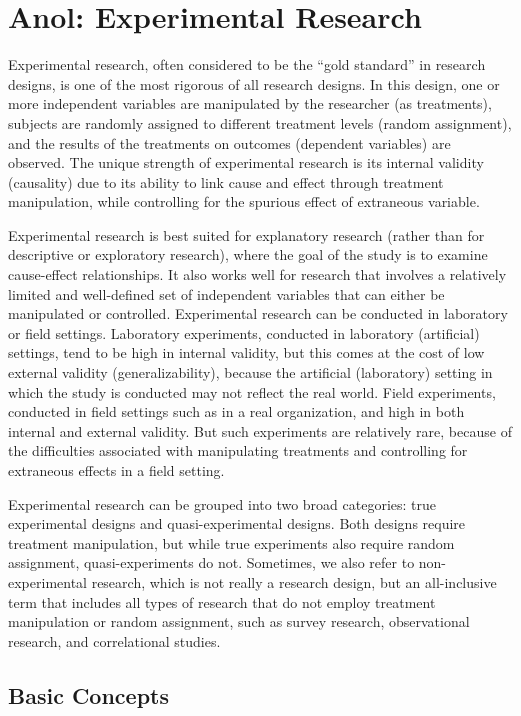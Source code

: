 \section{Anol: Experimental Research}

Experimental research, often considered to be the “gold standard” in research designs, is one of the most rigorous of all research designs. In this design, one or more independent variables are manipulated by the researcher (as treatments), subjects are randomly assigned to different treatment levels (random assignment), and the results of the treatments on outcomes (dependent variables) are observed. The unique strength of experimental research is its internal validity (causality) due to its ability to link cause and effect through treatment manipulation, while controlling for the spurious effect of extraneous variable.

Experimental research is best suited for explanatory research (rather than for descriptive or exploratory research), where the goal of the study is to examine cause-effect relationships. It also works well for research that involves a relatively limited and well-defined set of independent variables that can either be manipulated or controlled. Experimental research can be conducted in laboratory or field settings. Laboratory experiments, conducted in laboratory (artificial) settings, tend to be high in internal validity, but this comes at the cost of low external validity (generalizability), because the artificial (laboratory) setting in which the study is conducted may not reflect the real world. Field experiments, conducted in field settings such as in a real organization, and high in both internal and external validity. But such experiments are relatively rare, because of the difficulties associated with manipulating treatments and controlling for extraneous effects in a field setting.

Experimental research can be grouped into two broad categories: true experimental designs and quasi-experimental designs. Both designs require treatment manipulation, but while true experiments also require random assignment, quasi-experiments do not. Sometimes, we also refer to non-experimental research, which is not really a research design, but an all-inclusive term that includes all types of research that do not employ treatment manipulation or random assignment, such as survey research, observational research, and correlational studies.

\subsection{Basic Concepts}

